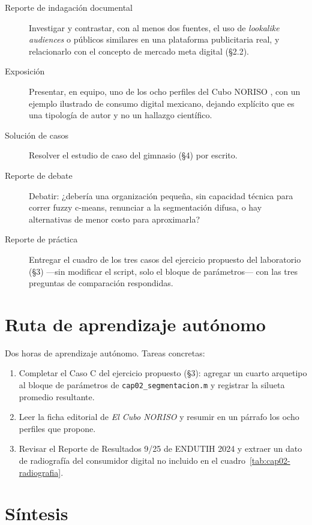 \begin{description}
  \item[Reporte de indagación documental] Investigar y contrastar, con al
  menos dos fuentes, el uso de \textit{lookalike audiences} o públicos
  similares en una plataforma publicitaria real, y relacionarlo con el
  concepto de mercado meta digital (§2.2).
  \item[Exposición] Presentar, en equipo, uno de los ocho perfiles del Cubo
  NORISO \parencite{delgado2015noriso}, con un ejemplo ilustrado de consumo
  digital mexicano, dejando explícito que es una tipología de autor y no un
  hallazgo científico.
  \item[Solución de casos] Resolver el estudio de caso del gimnasio (§4) por
  escrito.
  \item[Reporte de debate] Debatir: ¿debería una organización pequeña, sin
  capacidad técnica para correr fuzzy c-means, renunciar a la segmentación
  difusa, o hay alternativas de menor costo para aproximarla?
  \item[Reporte de práctica] Entregar el cuadro de los tres casos del
  ejercicio propuesto del laboratorio (\S 3) —sin modificar el script, solo
  el bloque de parámetros— con las tres preguntas de comparación respondidas.
\end{description}

\section{Ruta de aprendizaje autónomo}

Dos horas de aprendizaje autónomo. Tareas concretas:
\begin{enumerate}
  \item Completar el Caso C del ejercicio propuesto (§3): agregar un cuarto
  arquetipo al bloque de parámetros de \texttt{cap02\_segmentacion.m} y
  registrar la silueta promedio resultante.
  \item Leer la ficha editorial de \textit{El Cubo NORISO}
  \parencite{delgado2015noriso} y resumir en un párrafo los ocho perfiles que
  propone.
  \item Revisar el Reporte de Resultados 9/25 de ENDUTIH 2024 y extraer un
  dato de radiografía del consumidor digital no incluido en el
  cuadro~\ref{tab:cap02-radiografia}.
\end{enumerate}

\section{Síntesis}

